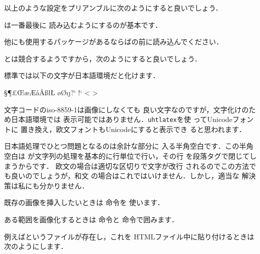 以上のような設定をプリアンブルに次のようにすると良いでしょう．

\begin{InTeX}
\usepackage[html,charset=Shift_JIS,fonts+,fn-in,png,imgdir:images/,
pic-m,pic-eqnarray,info]{tex4ht}
\end{InTeX}

は一番最後に
読み込むようにするのが基本です．

他にも使用するパッケージがあるならばの前に読み込んでください．

\begin{InTeX}
\usepackage[dvips]{graphicx,color}
\usepackage{url}
\end{InTeX}

とは競合するようですから，次のようにすると良いでしょう．

\begin{InTeX}
\usepackage{その他のパッケージ}
\usepackage[オプション]{tex4ht}
\usepackage[tex4ht]{hyperref}
\end{InTeX}


標準では以下の文字が日本語環境だと化けます．

\begin{InTeX}
\S \P \pounds \OE \ae \AE \aa \AA \ss \l \L
\o \O \i \j ?` !` \textvisiblespace \textless
\textgreater
\end{InTeX}

文字コードの{{iso-8859-1}}は画像にしなくても
良い文字なのですが，文字化けのため日本語環境では
表示可能ではありません．\texttt{uhtlatex}を使
ってUnicodeフォントに
置き換え，欧文フォントもUnicodeにすると表示でき
ると思われます．


日本語処理でひとつ問題となるのは余計な部分に
入る半角空白です．この半角空白は
が文字列の処理を基本的に行単位で行い，その行
を段落タグで閉じてしまうからです．
欧文の場合は適切な区切りで文字が改行
されるのでこの方法でも良いのでしょうが，和文
の場合はこれではいけません．しかし，適当な
解決策は私にも分かりません．%

既存の画像を挿入したいときは 命令を
使います．
\begin{Syntax}
\end{Syntax}
ある範囲を画像化するときは 
命令と 命令で囲みます．
\begin{Syntax}
\end{Syntax}
例えばというファイルが存在し，これを
HTMLファイル中に貼り付けるときは次のようにします．

